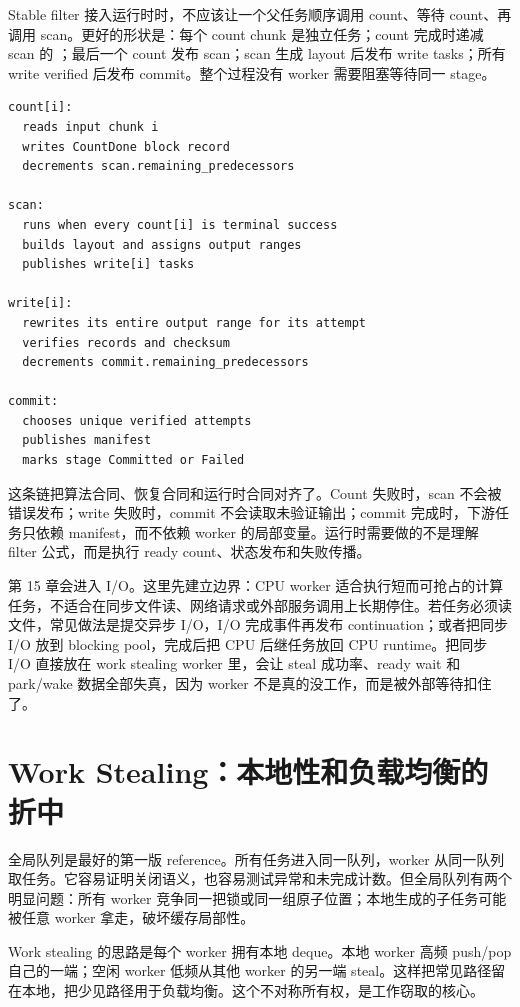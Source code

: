 Stable filter 接入运行时时，不应该让一个父任务顺序调用 count、等待 count、再调用 scan。更好的形状是：每个 count chunk 是独立任务；count 完成时递减 scan 的 ；最后一个 count 发布 scan；scan 生成 layout 后发布 write tasks；所有 write verified 后发布 commit。整个过程没有 worker 需要阻塞等待同一 stage。

\begin{lstlisting}[numbers=none,caption={stable filter 的非阻塞任务图账本}]
count[i]:
  reads input chunk i
  writes CountDone block record
  decrements scan.remaining_predecessors

scan:
  runs when every count[i] is terminal success
  builds layout and assigns output ranges
  publishes write[i] tasks

write[i]:
  rewrites its entire output range for its attempt
  verifies records and checksum
  decrements commit.remaining_predecessors

commit:
  chooses unique verified attempts
  publishes manifest
  marks stage Committed or Failed
\end{lstlisting}

这条链把算法合同、恢复合同和运行时合同对齐了。Count 失败时，scan 不会被错误发布；write 失败时，commit 不会读取未验证输出；commit 完成时，下游任务只依赖 manifest，而不依赖 worker 的局部变量。运行时需要做的不是理解 filter 公式，而是执行 ready count、状态发布和失败传播。

第 15 章会进入 I/O。这里先建立边界：CPU worker 适合执行短而可抢占的计算任务，不适合在同步文件读、网络请求或外部服务调用上长期停住。若任务必须读文件，常见做法是提交异步 I/O，I/O 完成事件再发布 continuation；或者把同步 I/O 放到 blocking pool，完成后把 CPU 后继任务放回 CPU runtime。把同步 I/O 直接放在 work stealing worker 里，会让 steal 成功率、ready wait 和 park/wake 数据全部失真，因为 worker 不是真的没工作，而是被外部等待扣住了。

\section{Work Stealing：本地性和负载均衡的折中}

全局队列是最好的第一版 reference。所有任务进入同一队列，worker 从同一队列取任务。它容易证明关闭语义，也容易测试异常和未完成计数。但全局队列有两个明显问题：所有 worker 竞争同一把锁或同一组原子位置；本地生成的子任务可能被任意 worker 拿走，破坏缓存局部性。

Work stealing 的思路是每个 worker 拥有本地 deque。本地 worker 高频 push/pop 自己的一端；空闲 worker 低频从其他 worker 的另一端 steal。这样把常见路径留在本地，把少见路径用于负载均衡。这个不对称所有权，是工作窃取的核心。

